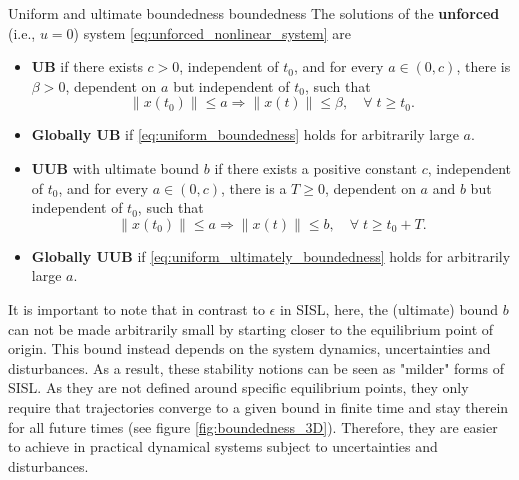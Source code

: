 \begin{definition}[list text=Uniform and ultimate boundedness]{Uniform and ultimate boundedness \cite{khalilNonlinearControl2015}}{boundedness}
  The solutions of the \textbf{unforced} (i.e., $u=0$) system \eqref{eq:unforced_nonlinear_system} are
  \begin{itemize}
    \item \textbf{UB} if there	exists $c > 0$, independent of $t_0$, and for every $a \in\left( 0, c \right)$, there is $\beta > 0$, dependent on $a$ but independent of $t_0$, such that
          \begin{equation} \label{eq:uniform_boundedness}
            \left\|x\left(t_0\right)\right\| \le a \Rightarrow \left\|x\left(t \right)\right\| \le \beta, \quad \forall \; t \ge t_0.
          \end{equation}
    \item \textbf{Globally UB} if \eqref{eq:uniform_boundedness} holds for arbitrarily large $a$.
    \item	\textbf{UUB} with ultimate bound $b$ if there exists a positive constant $c$, independent of $t_0$, and for every $a \in\left( 0, c \right)$, there is a $T \geq 0$, dependent on $a$ and $b$ but independent of $t_0$, such that
          \begin{equation} \label{eq:uniform_ultimately_boundedness}
            \left\|x\left(t_0\right)\right\| \le a \Rightarrow \left\|x\left(t \right)\right\| \le b, \quad \forall \; t \ge t_0 + T.
          \end{equation}
    \item \textbf{Globally UUB} if \eqref{eq:uniform_ultimately_boundedness} holds for arbitrarily large $a$.
  \end{itemize}
\end{definition}

It is important to note that in contrast to $\epsilon$ in SISL, here, the (ultimate) bound $b$ can not be made arbitrarily small by starting closer to the equilibrium point of origin. This bound instead depends on the system dynamics, uncertainties and disturbances. As a result, these stability notions can be seen as "milder" forms of SISL. As they are not defined around specific equilibrium points, they only require that trajectories converge to a given bound in finite time and stay therein for all future times (see figure \ref{fig:boundedness_3D}). Therefore, they are easier to achieve in practical dynamical systems subject to uncertainties and disturbances.

